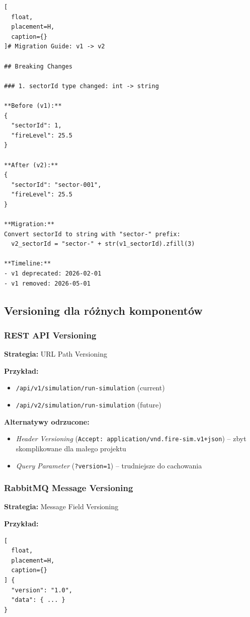 \documentclass[11pt,a4paper] {article}
\begin{document}
\begin{lstlisting}[
  float,
  placement=H,
  caption={}
]# Migration Guide: v1 -> v2

## Breaking Changes

### 1. sectorId type changed: int -> string

**Before (v1):**
{
  "sectorId": 1,
  "fireLevel": 25.5
}

**After (v2):**
{
  "sectorId": "sector-001",
  "fireLevel": 25.5
}

**Migration:**
Convert sectorId to string with "sector-" prefix:
  v2_sectorId = "sector-" + str(v1_sectorId).zfill(3)

**Timeline:**
- v1 deprecated: 2026-02-01
- v1 removed: 2026-05-01
\end{lstlisting}

\subsection{Versioning dla różnych komponentów}

\subsubsection{REST API Versioning}

\textbf{Strategia:} URL Path Versioning

\textbf{Przykład:}
\begin{itemize}
    \item \texttt{/api/v1/simulation/run-simulation} (current)
    \item \texttt{/api/v2/simulation/run-simulation} (future)
\end{itemize}

\textbf{Alternatywy odrzucone:}
\begin{itemize}
    \item \textit{Header Versioning} (\texttt{Accept: application/vnd.fire-sim.v1+json}) -- zbyt skomplikowane dla małego projektu
    \item \textit{Query Parameter} (\texttt{?version=1}) -- trudniejsze do cachowania
\end{itemize}

\subsubsection{RabbitMQ Message Versioning}

\textbf{Strategia:} Message Field Versioning

\textbf{Przykład:}
\begin{lstlisting}[
  float,
  placement=H,
  caption={}
] {
  "version": "1.0",
  "data": { ... }
}
\end{lstlisting}
\end{document}
